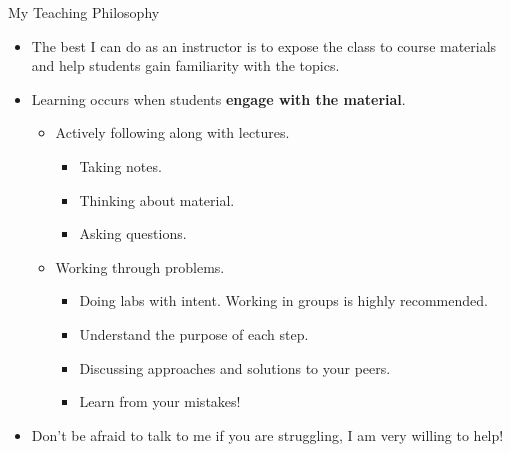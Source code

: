 {}\documentclass[letterpaper,
compress,
xcolor=x11names,
]{beamer}
\begin{document}
\begin{frame}{My Teaching Philosophy}
	\begin{itemize}
	\item The best I can do as an instructor is to expose the class to course materials and help students gain familiarity with the topics.
	\item Learning occurs when students \textbf{engage with the material}.
	\begin{itemize}
		\item<2-> Actively following along with lectures.
		\begin{itemize}
			\footnotesize
			\item Taking notes.
			\item Thinking about material.
			\item Asking questions.
		\end{itemize}
		\item<3-> Working through problems.
		\begin{itemize}
			\footnotesize
			\item Doing labs with intent. Working in groups is highly recommended.
			\item Understand the purpose of each step.
			\item Discussing approaches and solutions to your peers.
			\item Learn from your mistakes!
		\end{itemize}
	\end{itemize}
	\item<4-> Don't be afraid to talk to me if you are struggling, I am very willing to help!
	\end{itemize}
\end{frame}
\end{document}
